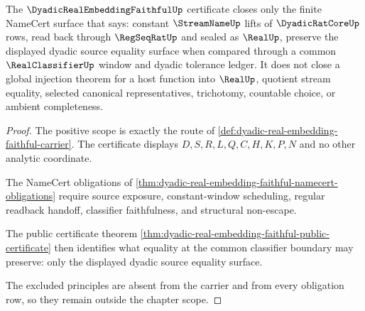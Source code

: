 \begin{theorem}
\label{thm:dyadic-real-embedding-faithful-scope}
The $\DyadicRealEmbeddingFaithfulUp$ certificate closes only the finite NameCert surface that says: constant $\StreamNameUp$ lifts of $\DyadicRatCoreUp$ rows, read back through $\RegSeqRatUp$ and sealed as $\RealUp$, preserve the displayed dyadic source equality surface when compared through a common $\RealClassifierUp$ window and dyadic tolerance ledger. It does not close a global injection theorem for a host function into $\RealUp$, quotient stream equality, selected canonical representatives, trichotomy, countable choice, or ambient completeness.
\end{theorem}
\begin{proof}
The positive scope is exactly the route of \autoref{def:dyadic-real-embedding-faithful-carrier}. The certificate displays $D,S,R,L,Q,C,H,K,P,N$ and no other analytic coordinate.

The NameCert obligations of \autoref{thm:dyadic-real-embedding-faithful-namecert-obligations} require source exposure, constant-window scheduling, regular readback handoff, classifier faithfulness, and structural non-escape.

The public certificate theorem \autoref{thm:dyadic-real-embedding-faithful-public-certificate} then identifies what equality at the common classifier boundary may preserve: only the displayed dyadic source equality surface.

The excluded principles are absent from the carrier and from every obligation row, so they remain outside the chapter scope.
\end{proof}


\begin{closurestatus}{\DyadicRealEmbeddingFaithfulUp}
  \theoryclosure{\seedClosure}
  \formalstatus{\unformalizedV}
\end{closurestatus}
